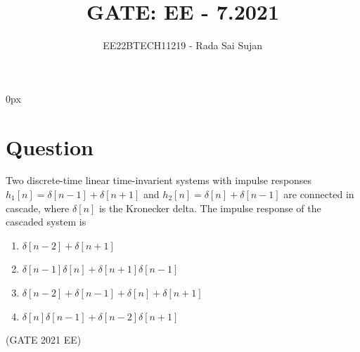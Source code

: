 \documentclass[journal,12pt,twocolumn]{IEEEtran}
\theoremstyle{remark}
\begin{document}
\parindent 0px

\title{GATE: EE - 7.2021}
\author{EE22BTECH11219 - Rada Sai Sujan$^{}$%
}
\maketitle
\newpage
\bigskip
\section*{Question}
Two discrete-time linear time-invarient systems with impulse responses $h_1[n]=\delta[n-1]+\delta[n+1]$ and $h_2[n]=\delta[n]+\delta[n-1]$ are connected in cascade, where $\delta[n]$ is the Kronecker delta. The impulse response of the cascaded system is   \\
\begin{enumerate}[label=(\alph*)]
    \item $\delta[n-2]+\delta[n+1]$
    \item $\delta[n-1]\delta[n]+\delta[n+1]\delta[n-1]$
    \item $\delta[n-2]+\delta[n-1]+\delta[n]+\delta[n+1]$
    \item $\delta[n]\delta[n-1]+\delta[n-2]\delta[n+1]$
\end{enumerate} \hfill(GATE 2021 EE)\\
\solution
\end{document}
